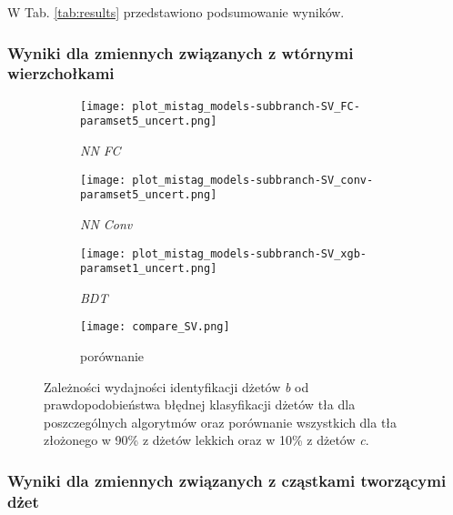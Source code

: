W Tab. \ref{tab:results} przedstawiono podsumowanie wyników.


\FloatBarrier
\subsubsection{Wyniki dla zmiennych związanych z wtórnymi wierzchołkami}

\begin{figure}[h]
	\centering
	
    \begin{subfigure}[b]{0.49\textwidth}
	\texttt{[image: plot\_mistag\_models-subbranch-SV\_FC-paramset5\_uncert.png]}
	\caption{\textit{NN FC}}
	\end{subfigure}
    \begin{subfigure}[b]{0.49\textwidth}
	\texttt{[image: plot\_mistag\_models-subbranch-SV\_conv-paramset5\_uncert.png]}	
	\caption{\textit{NN Conv}}
	\end{subfigure}
    \begin{subfigure}[b]{0.49\textwidth}
	\texttt{[image: plot\_mistag\_models-subbranch-SV\_xgb-paramset1\_uncert.png]}
	\caption{\textit{BDT}}
	\end{subfigure}
	\begin{subfigure}[b]{0.49\textwidth}
	\texttt{[image: compare\_SV.png]}
	\caption{porównanie}
	\end{subfigure}
	
	\caption{Zależności wydajności identyfikacji dżetów \textit{b} od prawdopodobieństwa błędnej klasyfikacji dżetów tła dla poszczególnych algorytmów oraz porównanie wszystkich dla tła złożonego w 90\% z dżetów lekkich oraz w 10\% z dżetów \textit{c}.}
	\label{fig:ROC_SV}
\end{figure}


\FloatBarrier
\subsubsection{Wyniki dla zmiennych związanych z cząstkami tworzącymi dżet}

